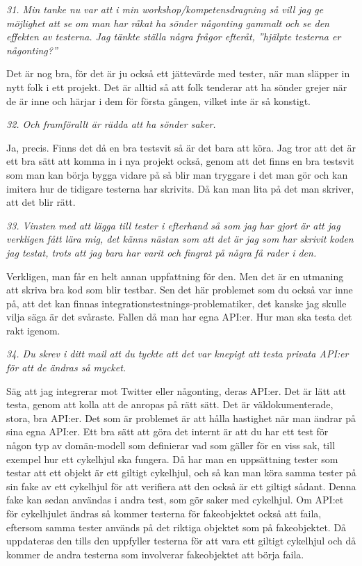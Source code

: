 \documentclass[11pt]{article}
\begin{document}
\emph{31. Min tanke nu var att i min workshop/kompetensdragning så vill jag ge möjlighet att se om man har råkat ha sönder någonting gammalt och se den effekten av testerna. Jag tänkte ställa några frågor efteråt, ”hjälpte testerna er någonting?”}

Det är nog bra, för det är ju också ett jättevärde med tester, när man släpper in nytt folk i ett projekt. Det är alltid så att folk tenderar att ha sönder grejer när de är inne och härjar i dem för första gången, vilket inte är så konstigt.

\emph{32. Och framförallt är rädda att ha sönder saker.}

Ja, precis. Finns det då en bra testsvit så är det bara att köra. Jag tror att det är ett bra sätt att komma in i nya projekt också, genom att det finns en bra testsvit som man kan börja bygga vidare på så blir man tryggare i det man gör och kan imitera hur de tidigare testerna har skrivits. Då kan man lita på det man skriver, att det blir rätt.

\emph{33. Vinsten med att lägga till tester i efterhand så som jag har gjort är att jag verkligen fått lära mig, det känns nästan som att det är jag som har skrivit koden jag testat, trots att jag bara har varit och fingrat på några få rader i den.}

Verkligen, man får en helt annan uppfattning för den. Men det är en utmaning att skriva bra kod som blir testbar. Sen det här problemet som du också var inne på, att det kan finnas integrationstestnings-problematiker, det kanske jag skulle vilja säga är det svåraste. Fallen då man har egna API:er. Hur man ska testa det rakt igenom.

\emph{34. Du skrev i ditt mail att du tyckte att det var knepigt att testa privata API:er för att de ändras så mycket.}

Säg att jag integrerar mot Twitter eller någonting, deras API:er. Det är lätt att testa, genom att kolla att de anropas på rätt sätt. Det är väldokumenterade, stora, bra API:er. Det som är problemet är att hålla hastighet när man ändrar på sina egna API:er. Ett bra sätt att göra det internt är att du har ett test för någon typ av domän-modell som definierar vad som gäller för en viss sak, till exempel hur ett cykelhjul ska fungera. Då har man en uppsättning tester som testar att ett objekt är ett giltigt cykelhjul, och så kan man köra samma tester på sin fake av ett cykelhjul för att verifiera att den också är ett giltigt sådant. Denna fake kan sedan användas i andra test, som gör saker med cykelhjul. Om API:et för cykelhjulet ändras så kommer testerna för fakeobjektet också att faila, eftersom samma tester används på det riktiga objektet som på fakeobjektet. Då uppdateras den tills den uppfyller testerna för att vara ett giltigt cykelhjul och då kommer de andra testerna som involverar fakeobjektet att börja faila.
\end{document}
